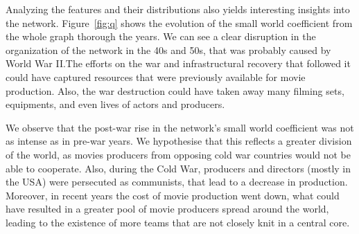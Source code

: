 Analyzing the features and their distributions also yields interesting insights
into the network. Figure~\ref{fig:q} shows the evolution of the small world
coefficient from the whole graph thorough the years. We can see a clear
disruption in the organization of the network in the 40s and 50s, that was
probably caused by World War II.\@ The efforts on the war and infrastructural
recovery that followed it could have captured resources that were previously
available for movie production. Also, the war destruction could have taken away
many filming sets, equipments, and even lives of actors and producers.

We observe that the post-war rise in the network's small world coefficient was
not as intense as in pre-war years. We hypothesise that this reflects a greater
division of the world, as movies producers from opposing cold war countries
would not be able to cooperate. Also, during the Cold War, producers and
directors (mostly in the USA) were persecuted as communists, that lead to a
decrease in production. Moreover, in recent years the cost of movie
production went down, what could have resulted in a greater pool of movie
producers spread around the world, leading to the existence of more teams that
are not closely knit in a central core.
